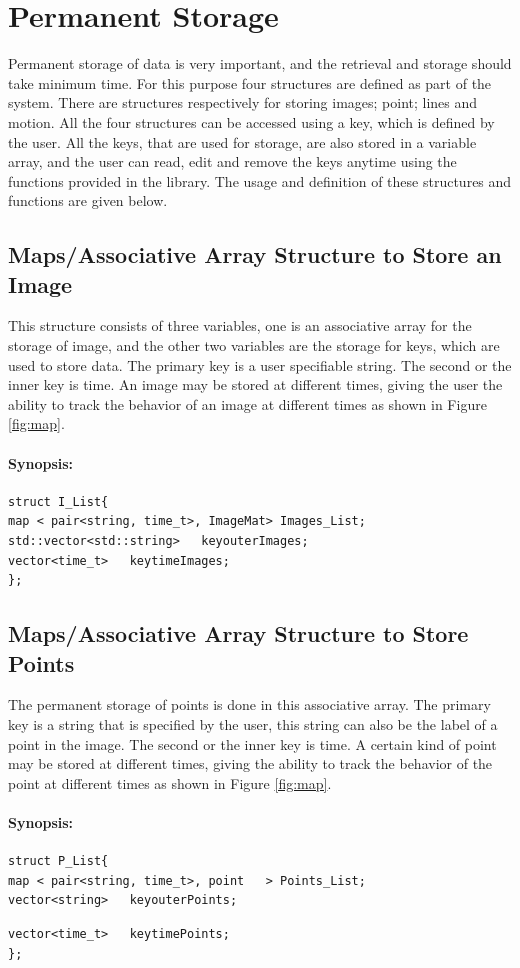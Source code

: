 \section{Permanent Storage}
 Permanent storage of data is very important, and the  retrieval and storage should take minimum time. For this purpose four structures are defined as part of the system. There are structures respectively for storing images; point; lines and motion. All the four structures can be accessed using a key, which is defined by the user. All the keys, that are used for storage, are also stored in a variable array, and the user can read, edit and remove the keys anytime using the functions provided in the library. The usage and definition of these structures and functions are given below.
\subsection{Maps/Associative Array Structure to Store an Image}
This structure consists of three variables, one is an associative array for the storage of image, and the other two variables are the storage for keys, which are used to store data. The primary key is a user specifiable string. The second or the inner key is time. An image may be stored at different times, giving the user the ability to track the behavior of an image at different times as shown in Figure \ref{fig:map}. 
\paragraph{Synopsis:}
\begin{lstlisting}
struct I_List{
map < pair<string, time_t>, ImageMat> Images_List;
std::vector<std::string>   keyouterImages;
vector<time_t>   keytimeImages;   
};
\end{lstlisting}
\subsection{Maps/Associative Array Structure  to Store Points}
    The permanent storage of points is done in this associative array. The primary key is a string that is specified by the user, this string can also be the label of a point in the image. The second or the inner key is time. A certain kind of point may be stored at different times, giving the ability to track the behavior of the point at different times as shown in Figure \ref{fig:map}.
\paragraph{Synopsis:}
\begin{lstlisting}
struct P_List{
map < pair<string, time_t>, point   > Points_List;
vector<string>   keyouterPoints;
\end{lstlisting}
\pagebreak
\begin{lstlisting}
vector<time_t>   keytimePoints;  
};
\end{lstlisting}
